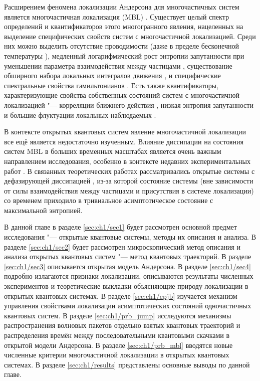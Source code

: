 Расширением феномена локализации Андерсона для многочастичных систем является многочастичная локализация (MBL) \cite{Basko2006, Gornyi2005}.
Существует целый спектр определений и квантификаторов этого многогранного явления, нацеленных на выделение специфических свойств систем с многочастичной локализацией.
Среди них можно выделить отсутствие проводимости \autocite{Gornyi2005} (даже в пределе бесконечной температуры \autocite{Basko2006}), медленный логарифмический рост энтропии запутанности при уменьшении параметра взаимодействия между частицами \autocite{Chiara2006, Znidaric2008, Bardarson2012, Serbyn2013_1}, существование обширного набора локальных интегралов движения \autocite{Serbyn2013_2}, и специфические спектральные свойства гамильтонианов \autocite{Oganesyan2007, Serbyn2016}.
Есть также квантификаторы, характеризующие свойства собственных состояний систем с многочастичной локализацией "--- корреляции ближнего действия \autocite{Pal2010}, низкая энтропия запутанности \autocite{Bauer2013, Kjll2014, Khemani2017} и большие флуктуации локальных наблюдаемых \autocite{Bera2015}.

В контексте открытых квантовых систем явление многочастичной локализации все ещё является недостаточно изученным. Влияние диссипации на состояния систем  MBL в больших временных масштабах является очень важным направлением исследования, особенно в контексте недавних экспериментальных работ \autocite{Schreiber2015, Choi2016, Bordia2017, Smith2016}. В связанных теоретических работах \autocite{Levi2016, Fischer2016, Medvedyeva2016} рассматривались открытые системы с дефазирующей диссипацией \autocite{Poletti2013}, из-за которой состояние системы (вне зависимости от силы взаимодействия между частицами и присутствия в системе локализации) со временем приходило в тривиальное асимптотическое состояние с максимальной энтропией.

В данной главе в разделе \cref{sec:ch1/sec1} будет рассмотрен основной предмет исследования "--- открытые квантовые системы, методы их описания и анализа. 
В разделе \cref{sec:ch1/sec2} будет рассмотрен микроскопический метод описания и анализа открытых квантовых систем "--- метод квантовых траекторий.
В разделе \cref{sec:ch1/sec3} описывается открытая модель Андерсона.
В разделе \cref{sec:ch1/sec4} подробно излагаются признаки локализации, описываются результаты численных экспериментов и теоретические выкладки объясняющие природу локализации в открытых квантовых системах. 
В разделе \cref{sec:ch1/epjb} изучается механизм управления свойствами локализации асимптотических состояний одночастичных квантовых систем. 
В разделе \cref{sec:ch1/prb_jump} исследуются механизмы распространения волновых пакетов отдельно взятых квантовых траекторий и распределения времён между последовательными квантовыми скачками в открытой модели Андерсона.
В разделе \cref{sec:ch1/prb_mbl} вводятся новые численные критерии многочастичной локализации в открытых квантовых системах.
В разделе \cref{sec:ch1/results} представлены основные выводы по данной главе.

